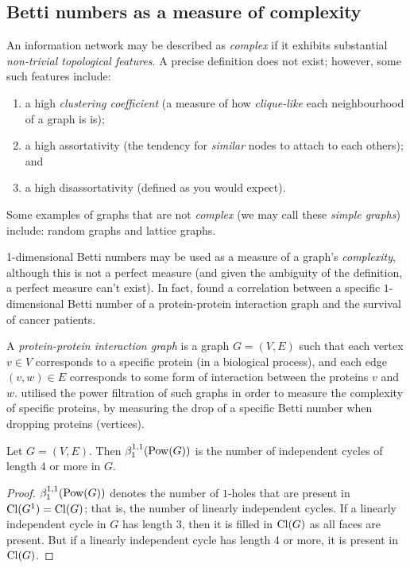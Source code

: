 \subsection{Betti numbers as a measure of complexity}

An information network may be described as \emph{complex} if it exhibits substantial \emph{non-trivial topological features}. A precise definition does not exist; however, some such features include:
\begin{enumerate}
    \item a high \emph{clustering coefficient} (a measure of how \emph{clique-like} each neighbourhood of a graph is is);
    \item a high assortativity (the tendency for \emph{similar} nodes to attach to each others); and
    \item a high disassortativity (defined as you would expect).
\end{enumerate}
Some examples of graphs that are not \emph{complex} (we may call these \emph{simple graphs}) include: random graphs and lattice graphs.

1-dimensional Betti numbers may be used as a measure of a graph's \emph{complexity}, although this is not a perfect measure (and given the ambiguity of the definition, a perfect measure can't exist). In fact, \textcite{benzekry2015design} found a correlation between a specific $1$-dimensional Betti number of a protein-protein interaction graph and the survival of cancer patients.

A \emph{protein-protein interaction graph} is a graph $G = (V,E)$ such that each vertex $v \in V$ corresponds to a specific protein (in a biological process), and each edge $(v,w) \in E$ corresponds to some form of interaction between the proteins $v$ and $w$. \textcite{benzekry2015design} utilised the power filtration of such graphs in order to measure the complexity of specific proteins, by measuring the drop of a specific Betti number when dropping proteins (vertices).

\begin{lemma}
    Let $G = (V,E)$. Then $\beta_1^{1,1}(\operatorname{Pow}(G))$ is the number of independent cycles of length $4$ or more in $G$.
\end{lemma}

\begin{proof}
    $\beta_1^{1,1}(\operatorname{Pow}(G))$ denotes the number of $1$-holes that are present in $\operatorname{Cl}(G^1) = \operatorname{Cl}(G)$; that is, the number of linearly independent cycles. If a linearly independent cycle in $G$ has length 3, then it is filled in $\operatorname{Cl}(G)$ as all faces are present. But if a linearly independent cycle has length 4 or more, it is present in $\operatorname{Cl}(G)$.
\end{proof}

